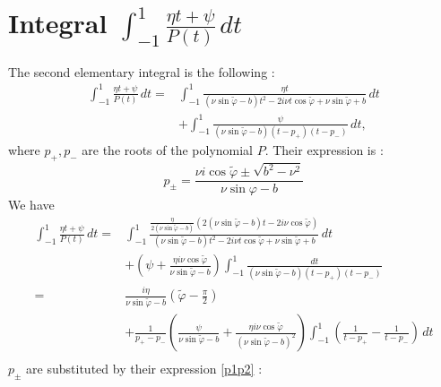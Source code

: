 \section[Second elementary integral]{Integral $\int_{-1}^1 \frac{\eta t+ \psi}{P(t)}\, dt$}
\label{calculintP}
The second elementary integral is the following :
\begin{equation}
\begin{split}
\int_{-1}^1 \frac{\eta t+ \psi}{P(t)}\, dt =& \int_{-1}^1 \frac{\eta t}{(\nu\sin\tilde{\varphi}-b)t^2-2i\nu t\cos\tilde{\varphi}+\nu\sin\tilde{\varphi}+b}\,dt\\
 &+\int_{-1}^1 \frac{\psi}{(\nu\sin\tilde{\varphi}-b)(t-p_+)(t-p_-)}\, dt,
\end{split}
\end{equation}
where $p_+,p_-$ are the roots of the polynomial $P$. Their expression is :
\begin{equation}
p_\pm=\frac{\nu i \cos\tilde{\varphi}\pm \sqrt{b^2-\nu^2}}{\nu\sin\varphi-b}
\label{p1p2}
\end{equation}
We have 
\begin{equation}
\begin{split}
\int_{-1}^1 \frac{\eta t+ \psi}{P(t)}\, dt =& \int_{-1}^1 \frac{\frac{\eta}{2(\nu\sin\tilde{\varphi}-b)}(2(\nu\sin\tilde{\varphi}-b)t-2i\nu\cos\tilde{\varphi})}{(\nu\sin\tilde{\varphi}-b)t^2-2i\nu t\cos\tilde{\varphi}+\nu\sin\tilde{\varphi}+b}\,dt\\
&+(\psi+\frac{\eta i\nu\cos\tilde{\varphi}}{\nu\sin\tilde{\varphi}-b})\int_{-1}^1 \frac{dt}{(\nu\sin\tilde{\varphi}-b)(t-p_+)(t-p_-)}\\
=&\frac{i\eta}{\nu\sin\tilde{\varphi}-b}(\tilde{\varphi}-\frac{\pi}{2})\\
&+\frac{1}{p_+-p_-}\left(\frac{\psi}{\nu\sin\tilde{\varphi}-b}+\frac{\eta i\nu\cos\tilde{\varphi}}{(\nu\sin\tilde{\varphi}-b)^2}\right)\int_{-1}^1 \left(\frac{1}{t-p_+}-\frac{1}{t-p_-}\right)\,dt\\
\end{split}
\end{equation}
$p_\pm$ are substituted by their expression \eqref{p1p2} :
